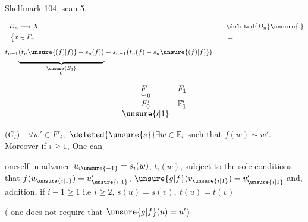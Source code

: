 Shelfmark 104, scan 5.



\[
\begin{aligned}
D_n&\longrightarrow X &\quad&\deleted{D_n}\unsure{.}\\
\bigl\{x&\in F_n && =\\
t_{n-1}{}&
\underset{\substack{\unsure{E_3}\hfill\\0}}{\underbrace{\vphantom{\bigg|}\bigl(t_n\unsure{(f)|f)}-s_n(f)\bigr)}}
-s_{n-1}\bigl(t_n(f)-s_n\unsure{(f)|f)}\bigr)&&
\end{aligned}
\]

\[
\begin{array}{cc}
\underset{\smile}{F}_0 & F_1\\[.6em]
F'_0 & \mathbb F'_1\\
\unsure{\prime|1}&
\end{array}
\]

\begin{flushright}
\begin{minipage}{.74\linewidth}
\(\bigl(C_i\bigr)\quad\forall w'\in F'_i,\)
 \(\deleted{\unsure{s}}\exists w\in\mathbb F_i\) such that
\(f(w)\sim w'\). Moreover if \(i\geq1\), One can
\par\noindent{}\begin{minipage}{.89\linewidth}
 oneself
in advance \(u_{i\unsure{-1}}=s_i(w)\), \(t_i(w)\),
 subject to the sole conditions  that
\(f(u_{\unsure{i|1}})=u'_{\unsure{i|1}}\), 
\(\unsure{g|f}(v_{\unsure{i|1}})=v'_{\unsure{i|1}}\)
and,  addition, if \(i-1\geq1\) i.e \(i\geq2\), 
\(s(u)=s(v),\ t(u)=t(v)\)
\end{minipage}

( one does not require that \(\unsure{g|f}(u)=u'\))
\end{minipage}
\end{flushright}

